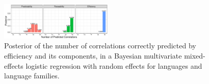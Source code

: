 \documentclass[12pt]{article}
\begin{document}
\begin{figure}
	\begin{center}
	\includegraphics[width=0.48\textwidth]{../results/correlations/figures/posterior-satisfied-universals-together-large-three.pdf}
	\end{center}
	\caption{Posterior of the number of correlations correctly predicted by efficiency and its components, in a Bayesian multivariate mixed-effects logistic regression with random effects for languages and language families.}\label{fig:posterior}
\end{figure}
\end{document}
